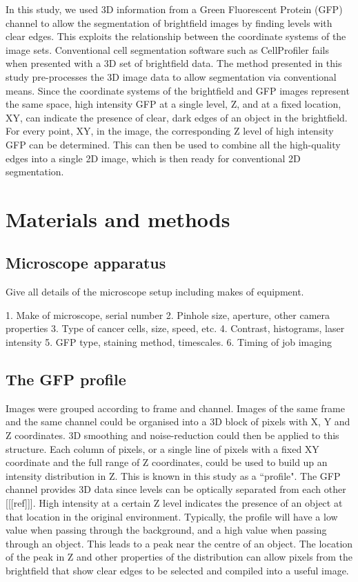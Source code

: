 \documentclass[preprint,11pt,5p,twocolumn]{elsarticle}
\begin{document}
In this study, we used 3D information from a Green Fluorescent Protein (GFP) channel to allow the segmentation of brightfield images by finding levels with clear edges. This exploits the relationship between the coordinate systems of the image sets. Conventional cell segmentation software such as CellProfiler fails when presented with a 3D set of brightfield data. The method presented in this study pre-processes the 3D image data to allow segmentation via conventional means. Since the coordinate systems of the brightfield and GFP images represent the same space, high intensity GFP at a single level, Z, and at a fixed location, XY, can indicate the presence of clear, dark edges of an object in the brightfield. For every point, XY, in the image, the corresponding Z level of high intensity GFP can be determined. This can then be used to combine all the high-quality edges into a single 2D image, which is then ready for conventional 2D segmentation.

\section{Materials and methods}
\label{S:method}

\subsection{Microscope apparatus}
Give all details of the microscope setup including makes of equipment.

1. Make of microscope, serial number
2. Pinhole size, aperture, other camera properties
3. Type of cancer cells, size, speed, etc.
4. Contrast, histograms, laser intensity
5. GFP type, staining method, timescales.
6. Timing of job imaging

\subsection{The GFP profile}
\label{S:method.gfpprofile}

Images were grouped according to frame and channel. Images of the same frame and the same channel could be organised into a 3D block of pixels with X, Y and Z coordinates. 3D smoothing and noise-reduction could then be applied to this structure. Each column of pixels, or a single line of pixels with a fixed XY coordinate and the full range of Z coordinates, could be used to build up an intensity distribution in Z. This is known in this study as a ``profile". The GFP channel provides 3D data since levels can be optically separated from each other [[[ref]]]. High intensity at a certain Z level indicates the presence of an object at that location in the original environment. Typically, the profile will have a low value when passing through the background, and a high value when passing through an object. This leads to a peak near the centre of an object. The location of the peak in Z and other properties of the distribution can allow pixels from the brightfield that show clear edges to be selected and compiled into a useful image.
\end{document}

